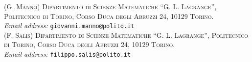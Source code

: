 \documentclass{article}
\begin{document}
\vspace{1.5cm}
\noindent
\textsc{(G. Manno) Dipartimento di Scienze Matematiche ``G. L. Lagrange'', Politecnico di Torino, Corso Duca degli Abruzzi 24, 10129 Torino.}\\
\textit{Email address:} \texttt{giovanni.manno@polito.it}\\

\noindent
\textsc{(F. Salis) Dipartimento di Scienze Matematiche ``G. L. Lagrange'', Politecnico di Torino, Corso Duca degli Abruzzi 24, 10129 Torino.}\\
\textit{Email address:} \texttt{filippo.salis@polito.it}
\end{document}

